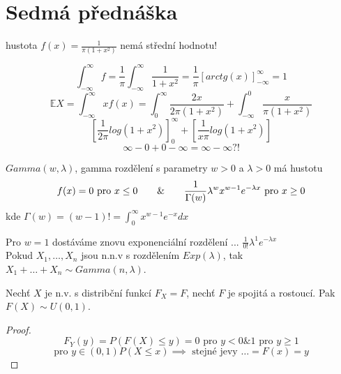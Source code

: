 \documentclass[../main.tex]{subfiles}
\begin{document}
\section{Sedmá přednáška}


\begin{definition}

    hustota $f(x) = \frac{1}{\pi (1+x^2)}$
    nemá střední hodnotu!

    \begin{remark}
        \[\int^\infty_{-\infty} f = \frac{1}{\pi} \int^\infty_{-\infty} \frac{1}{1+x^2} = \frac{1}{\pi}\left[arctg(x)\right]^\infty_{-\infty} = 1\]
        \[\mathbb{E}X = \int^\infty_{-\infty} x f(x) = \int^\infty_0 \frac{2x}{2\pi (1+x^2)} + \int^0_{-\infty}\frac{x}{\pi (1+x^2)}\]
        \[\left[\frac{1}{2\pi}log(1+x^2)\right]^\infty_0 + \left[\frac{1}{x\pi} log(1+x^2)\right]\]
        \[\infty - 0 + 0- \infty = \infty - \infty ?!\]
    \end{remark}
    
\end{definition}

\begin{definition} 

    $Gamma(w,\lambda)$, gamma rozdělení s parametry $w > 0$ a $\lambda > 0$ má hustotu
    \[f(x) = 0 \text{ pro } x \leq 0 \hspace{7mm} \& \hspace{7mm} \frac{1}{\Gamma(w)}\lambda^w x^{w-1} e^{-\lambda x} \text{ pro } x\geq 0\]
    kde $\Gamma(w) = (w-1)! = \int^\infty_0 x^{w-1}e^{-x}dx$

    Pro $w = 1$ dostáváme znovu exponenciální rozdělení ... $\frac{1}{0!}\lambda^1 e^{-\lambda x}$\\
    Pokud $X_1,\dots ,X_n$ jsou n.n.v s rozdělením $Exp(\lambda)$, tak $X_1 + \dots + X_n \sim Gamma(n, \lambda)$.  
\end{definition}
\begin{theorem}
    Nechť $X$ je n.v. s distribční funkcí $F_X = F$, nechť $F$ je spojitá a rostoucí. Pak $F(X) \sim U(0,1)$.\\
    
    \begin{proof}
        \[F_Y(y) = P(F(X) \leq y) = 0 \text{ pro } y < 0 \& 1 \text{ pro } y \geq 1\]
        \[\text{pro } y \in (0,1) P(X \leq x) \implies \text{ stejné jevy } \dots = F(x) = y\]
    \end{proof}
\end{theorem}
\end{document}
